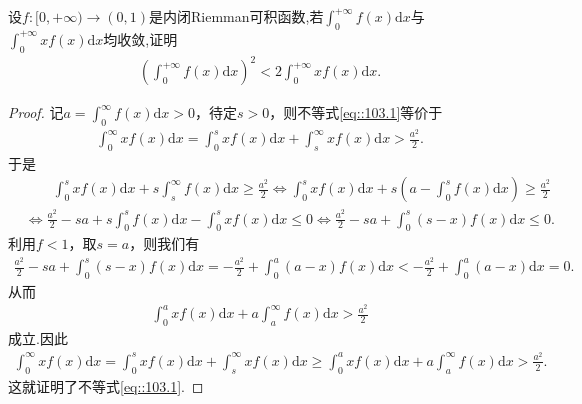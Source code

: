 \documentclass[../../main.tex]{subfiles}
\begin{document}
\begin{example}
设$f:[0,+\infty)\to (0,1)$是内闭Riemman可积函数,若$\int_0^{+\infty} f(x) \mathrm{d}x$与$\int_0^{+\infty} x f(x) \mathrm{d}x$均收敛,证明
\begin{align}
\left( \int_0^{+\infty} f(x) \mathrm{d}x \right)^2 < 2 \int_0^{+\infty} x f(x) \mathrm{d}x.\label{eq::103.1}
\end{align}
\end{example}
\begin{proof}
记$a=\int_0^{\infty} f(x) \mathrm{d}x>0$，待定$s>0$，则不等式\eqref{eq::103.1}等价于
\begin{align*}
\int_0^{\infty} x f(x) \mathrm{d}x = \int_0^s x f(x) \mathrm{d}x + \int_s^{\infty} x f(x) \mathrm{d}x > \frac{a^2}{2}.
\end{align*}
于是
\begin{align*}
&\quad \quad \int_0^s x f(x) \mathrm{d}x + s \int_s^{\infty} f(x) \mathrm{d}x \geqslant \frac{a^2}{2} \Longleftrightarrow \int_0^s x f(x) \mathrm{d}x + s \left( a - \int_0^s f(x) \mathrm{d}x \right) \geqslant \frac{a^2}{2} \\
&\Longleftrightarrow \frac{a^2}{2} - sa + s \int_0^s f(x) \mathrm{d}x - \int_0^s x f(x) \mathrm{d}x \leqslant 0 \Longleftrightarrow \frac{a^2}{2} - sa + \int_0^s (s - x) f(x) \mathrm{d}x \leqslant 0.
\end{align*}
利用$f<1$，取$s=a$，则我们有
\begin{align*}
\frac{a^2}{2} - sa + \int_0^s (s - x) f(x) \mathrm{d}x = -\frac{a^2}{2} + \int_0^a (a - x) f(x) \mathrm{d}x < -\frac{a^2}{2} + \int_0^a (a - x) \mathrm{d}x = 0.
\end{align*}
从而
\begin{align*}
\int_0^a x f(x) \mathrm{d}x + a \int_a^{\infty} f(x) \mathrm{d}x > \frac{a^2}{2}
\end{align*}
成立.因此
\begin{align*}
\int_0^{\infty} x f(x) \mathrm{d}x = \int_0^s x f(x) \mathrm{d}x + \int_s^{\infty} x f(x) \mathrm{d}x \geqslant \int_0^a x f(x) \mathrm{d}x + a \int_a^{\infty} f(x) \mathrm{d}x > \frac{a^2}{2}.
\end{align*}
这就证明了不等式\eqref{eq::103.1}.
\end{proof}
\end{document}
